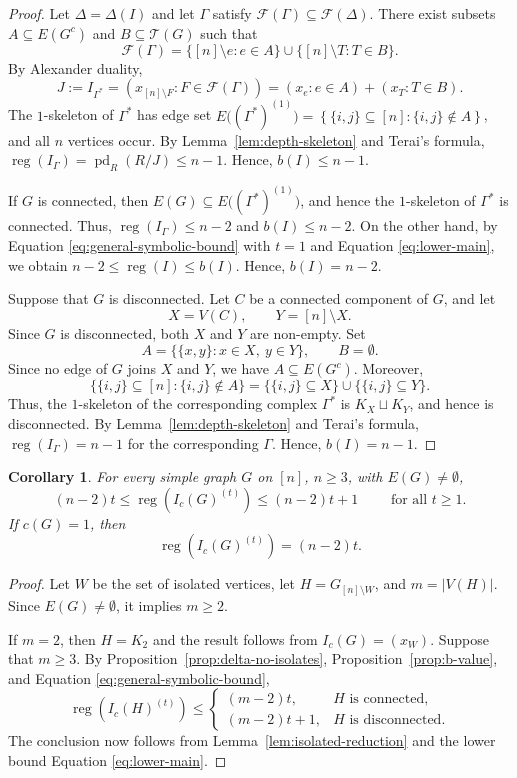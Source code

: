 \documentclass[12pt]{amsart}
\newtheorem{corollary}[proposition]{Corollary}
\DeclareMathOperator{\pd}{pd}
\DeclareMathOperator{\reg}{reg}
\newcommand{\cI}{I_c}
\begin{document}
\begin{proof}
Let $\Delta=\Delta(I)$ and let $\Gamma$ satisfy $\mathcal F(\Gamma)\subseteq\mathcal F(\Delta)$. There exist subsets $A\subseteq E(G^c)$ and $B\subseteq\mathcal T(G)$ such that 
\[
\mathcal F(\Gamma)=\{[n]\setminus e:e\in A\}\cup\{[n]\setminus T:T\in B\}.
\]
By Alexander duality,
\[
J:=I_{\Gamma^*}
=
\left(
x_{[n]\setminus F}:F\in\mathcal F(\Gamma)
\right)
=
(x_e:e\in A)+(x_T:T\in B).
\]
The $1$-skeleton of $\Gamma^*$ has edge set \( E\bigl((\Gamma^*)^{(1)}\bigr) = \left\{\{i,j\}\subseteq [n] : \{i,j\}\notin A\right\}\), and all $n$ vertices occur. By Lemma~\ref{lem:depth-skeleton} and Terai's formula, $\reg(I_\Gamma)=\pd_R(R/J)\le n-1$. Hence, $b(I)\le n-1$.

If $G$ is connected, then $E(G)\subseteq E\bigl((\Gamma^*)^{(1)})$, and hence the $1$-skeleton of $\Gamma^*$ is connected. Thus, $\reg(I_\Gamma) \le n-2$ and $b(I)\le n-2$. On the other hand, by Equation \eqref{eq:general-symbolic-bound} with $t=1$ and Equation \eqref{eq:lower-main}, we obtain  $n-2\le\reg (I)\le b(I)$. Hence, $b(I)=n-2$.
\noindent

Suppose that \(G\) is disconnected. Let \(C\) be a connected component
of \(G\), and let
\[
X=V(C),\qquad Y=[n]\setminus X.
\]
Since \(G\) is disconnected, both \(X\) and \(Y\) are non-empty. Set
\[
A=\{\{x,y\}:x\in X,\ y\in Y\},
\qquad B=\emptyset.
\]
Since no edge of \(G\) joins \(X\) and \(Y\), we have $A\subseteq E(G^c)$. Moreover, 
\[
\bigl\{\{i,j\}\subseteq [n] : \{i,j\}\notin A\bigr\}
=
\bigl\{\{i,j\}\subseteq X\bigr\}
\cup
\bigl\{\{i,j\}\subseteq Y\bigr\}.
\]
Thus, the \(1\)-skeleton of the corresponding complex
\(\Gamma^*\) is \(K_X\sqcup K_Y\), and hence is disconnected. By Lemma~\ref{lem:depth-skeleton} and Terai's formula, $\reg(I_\Gamma)=n-1$ for the corresponding $\Gamma$. Hence, $b(I)=n-1$.
\end{proof}


\begin{corollary}\label{cor:two-values}
For every simple graph $G$ on $[n]$, $n\ge3$, with $E(G)\ne\emptyset$,
\[
(n-2)t \le \reg(\cI(G)^{(t)}) \le (n-2)t+1
\qquad  \text{ for all } t\ge1.
\]
If $c(G)=1$, then
\[
\reg(I_c(G)^{(t)})=(n-2)t.
\]
\end{corollary}
\begin{proof}
Let $W$ be the set of isolated vertices, let $H=G_{[n]\setminus W}$, and $m=|V(H)|$. Since $E(G)\neq\emptyset$, it implies $m\ge2$.

If $m=2$, then $H=K_2$ and the result follows from $I_c(G)=(x_W)$. Suppose that $m\ge3$. By Proposition~\ref{prop:delta-no-isolates}, Proposition~\ref{prop:b-value}, and Equation \eqref{eq:general-symbolic-bound},
\[
\reg(I_c(H)^{(t)}) \le
\begin{cases}
(m-2)t,&H\text{ is connected},\\
(m-2)t+1,&H\text{ is disconnected}.
\end{cases}
\]
The conclusion now follows from Lemma~\ref{lem:isolated-reduction} and the lower bound Equation \eqref{eq:lower-main}.
\end{proof}
\end{document}
